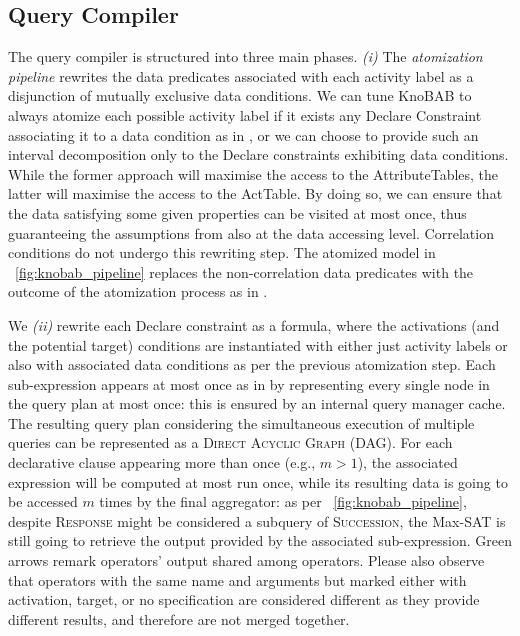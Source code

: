 \subsection{Query Compiler}\label{sec:qc}
The query compiler is structured into three main phases. \textit{(i)} The \textit{atomization pipeline}  rewrites the data predicates 
associated with each activity label as a 
disjunction of mutually exclusive data conditions. We can tune KnoBAB to always atomize each possible activity label if it exists any Declare Constraint associating it to a data condition as in \cite{bpm21}, or we can choose to provide such an interval decomposition only to the Declare constraints exhibiting data conditions. While the former approach will maximise the access to the \textsf{AttributeTable}s, the latter will maximise the access to the \textsf{ActTable}. By doing so, we can ensure that the data satisfying some given properties can be visited at most once, thus guaranteeing the assumptions from \cite{BellatrecheKB21} also at the data accessing level. Correlation conditions do not undergo this rewriting step. The atomized model in \figurename~\ref{fig:knobab_pipeline} replaces the non-correlation data predicates with the outcome of the atomization process as in \cite{bpm21}. 


We \textit{(ii)} rewrite each Declare constraint as a \xLTLf formula, where the activations (and the potential target) conditions are instantiated with either just activity labels or also with associated data conditions as per the previous atomization step. 
Each sub-expression appears at most once as in \cite{BellatrecheKB21} by representing every single node in the query plan at most once: this is ensured by an internal query manager cache. The resulting query plan considering the simultaneous execution of multiple queries can be represented as a \textsc{Direct Acyclic Graph} (DAG).  
For each declarative clause appearing more than once (e.g., $m>1$), the associated \xLTLf expression will be computed at most run once, while its resulting data is going to be accessed $m$ times by the final aggregator: as per \figurename~\ref{fig:knobab_pipeline}, despite \textsc{Response} might be considered a subquery of \textsc{Succession}, the Max-SAT is still going to retrieve the output provided by the associated sub-expression. Green arrows remark operators' output shared among operators. Please also observe that operators with the same name and arguments but marked either with activation, target, or no specification are considered different as they provide different results, and therefore are not merged together. 

